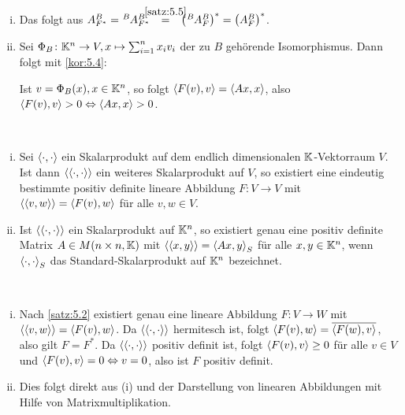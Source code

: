 \begin{beweis}
	\mbox{} \\[-0.9cm]
	\begin{enumerate}[(i)]
		\item Das folgt aus $A^B_{F^*} = \mat{A}{B}{B}{F^*} \stack{\ref{satz:5.5}}{=} \enb{\mat{A}{B}{B}{F}}^* = \enb{A^B_F}^*$.
		\item Sei $\Phi_B\colon \mathbb{K}^n \rightarrow V, x \mapsto \sum_{i=1}^{n} x_i v_i$ der zu $B$ gehörende Isomorphismus.
		Dann folgt mit \autoref{kor:5.4}:
		
		Ist $v = \Phi_B(x), x \in \mathbb{K}^n$, so folgt $\left\langle F(v),v\right\rangle = \left\langle Ax,x\right\rangle$, also $\left\langle F(v),v\right\rangle > 0 \Leftrightarrow \left\langle Ax,x\right\rangle > 0$. \qedhere
	\end{enumerate}
\end{beweis}

\begin{korollar}
	\label{kor:5.10}
	\mbox{} \\[-1.4cm]
	\begin{enumerate}[(i)]
		\item Sei $\left\langle\cdot,\cdot\right\rangle$ ein Skalarprodukt auf dem endlich dimensionalen $\mathbb{K}$-Vektorraum $V$.
		Ist dann $\left\langle\left\langle\cdot,\cdot\right\rangle\right\rangle$ ein weiteres Skalarprodukt auf $V$, so existiert eine eindeutig bestimmte positiv definite lineare Abbildung $F\colon V \rightarrow V$ mit $\left\langle\left\langle v,w\right\rangle\right\rangle = \left\langle F(v),w\right\rangle$ für alle $v,w \in V$.
		\item Ist $\left\langle\left\langle\cdot,\cdot\right\rangle\right\rangle$ ein Skalarprodukt auf $\mathbb{K}^n$, so existiert genau eine positiv definite Matrix $A \in M(n \times n,\mathbb{K})$ mit $\left\langle\left\langle x,y\right\rangle\right\rangle = \left\langle Ax,y\right\rangle_S$ für alle $x,y \in \mathbb{K}^n$, wenn $\left\langle\cdot,\cdot\right\rangle_S$ das Standard-Skalarprodukt auf $\mathbb{K}^n$ bezeichnet.
	\end{enumerate}
\end{korollar}

\begin{beweis}
	\mbox{} \\[-.9cm]
	\begin{enumerate}[(i)]
		\item Nach \autoref{satz:5.2} existiert genau eine lineare Abbildung $F \colon V \rightarrow W$ mit $\left\langle\left\langle v,w\right\rangle\right\rangle = \left\langle F(v),w\right\rangle$.
		Da $\left\langle\left\langle\cdot,\cdot\right\rangle\right\rangle$ hermitesch ist, folgt $\left\langle F(v),w\right\rangle = \overline{\left\langle F(w),v\right\rangle}$, also gilt $F = F^*$.
		Da $\left\langle\left\langle\cdot,\cdot\right\rangle\right\rangle$ positiv definit ist, folgt $\left\langle F(v),v\right\rangle \geq 0$ für alle $v \in V$ und $\left\langle F(v),v\right\rangle = 0 \Leftrightarrow v = 0$, also ist $F$ positiv definit.
		\item Dies folgt direkt aus (i) und der Darstellung von linearen Abbildungen mit Hilfe von Matrixmultiplikation. \qedhere
	\end{enumerate}
\end{beweis}

